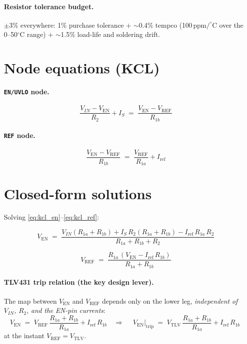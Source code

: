 \documentclass[11pt]{article}
\newcommand{\Ven}{V_{\mathrm{EN}}}
\newcommand{\Vref}{V_{\mathrm{REF}}}
\newcommand{\Vtlv}{V_{\mathrm{TLV}}}
\newcommand{\Iref}{I_{\mathrm{ref}}}
\newcommand{\Rone}{R_{1a}}
\newcommand{\Rtwo}{R_{1b}}
\newcommand{\Rt}{R_{2}}
\begin{document}
\paragraph{Resistor tolerance budget.} $\pm3\%$ everywhere: 1\% purchase
tolerance $+$ $\sim$0.4\% tempco (100\,ppm$/^{\circ}$C over the
0--50$^{\circ}$C range) $+$ $\sim$1.5\% load-life and soldering drift.

\section{Node equations (KCL)}

\paragraph{\texttt{EN/UVLO} node.}
\begin{equation}
\frac{V_{IN}-\Ven}{\Rt}+I_S \;=\; \frac{\Ven-\Vref}{\Rtwo}
\label{eq:kcl_en}
\end{equation}

\paragraph{\texttt{REF} node.}
\begin{equation}
\frac{\Ven-\Vref}{\Rtwo} \;=\; \frac{\Vref}{\Rone}+\Iref
\label{eq:kcl_ref}
\end{equation}

\section{Closed-form solutions}

Solving \eqref{eq:kcl_en}--\eqref{eq:kcl_ref}:

\begin{equation}
\boxed{\;\Ven \;=\; \frac{V_{IN}(\Rone+\Rtwo)+I_S\,\Rt(\Rone+\Rtwo)-\Iref\,\Rone\,\Rt}{\Rone+\Rtwo+\Rt}\;}
\label{eq:ven}
\end{equation}

\begin{equation}
\boxed{\;\Vref \;=\; \frac{\Rone\,(\Ven-\Iref\,\Rtwo)}{\Rone+\Rtwo}\;}
\label{eq:vref}
\end{equation}

\paragraph{TLV431 trip relation (the key design lever).}
The map between $\Ven$ and $\Vref$ depends only on the lower leg, \emph{independent of
$V_{IN}$, $\Rt$, and the EN-pin currents}:
\begin{equation}
\Ven \;=\; \Vref\,\frac{\Rone+\Rtwo}{\Rone}+\Iref\,\Rtwo
\quad\Longrightarrow\quad
\boxed{\;\Ven\big|_{\mathrm{trip}} \;=\; \Vtlv\,\frac{\Rone+\Rtwo}{\Rone}+\Iref\,\Rtwo\;}
\label{eq:ven_trip}
\end{equation}
at the instant $\Vref=\Vtlv$.
\end{document}
